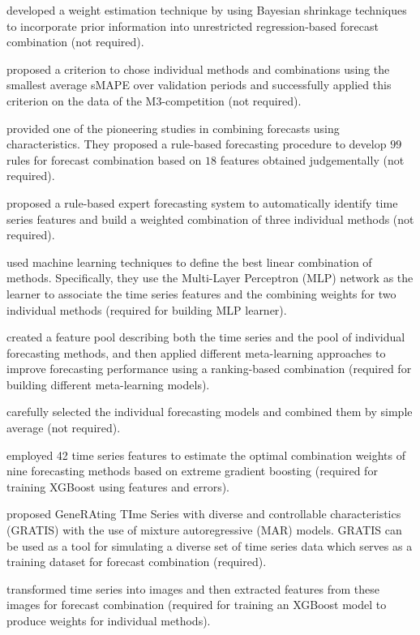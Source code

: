 \documentclass[11pt]{article}
\begin{document}
\cite{Diebold1990-fk} developed a weight estimation technique by using Bayesian shrinkage techniques to incorporate prior information into unrestricted regression-based forecast combination (not required).

\cite{Hibon2005-ok} proposed a criterion to chose individual methods and combinations using the smallest average sMAPE over validation periods and successfully applied this criterion on the data of the M3-competition (not required).

\cite{Collopy1992-ey} provided one of the pioneering studies in combining forecasts using characteristics. They proposed a rule-based forecasting procedure to develop $99$ rules for forecast combination based on $18$ features obtained judgementally (not required).

\cite{Vokurka1996-ot} proposed a rule-based expert forecasting system to automatically identify time series features and build a weighted combination of three individual methods (not required).

\cite{Prudencio2004-ze} used machine learning techniques to define the best linear combination of methods. Specifically, they use the Multi-Layer Perceptron (MLP) network as the learner to associate the time series features and the combining weights for two individual methods (required for building MLP learner).

\cite{Lemke2010-wn} created a feature pool describing both the time series and the pool of individual forecasting methods, and then applied different meta-learning approaches to improve forecasting performance using a ranking-based combination (required for building different meta-learning models).

\cite{Andrawis2011-fm} carefully selected the individual forecasting models and combined them by simple average (not required).

\cite{Montero-Manso2020-tq} employed 42 time series features to estimate the optimal combination weights of nine forecasting methods based on extreme gradient boosting (required for training XGBoost using features and errors).

\cite{Kang2020-rl} proposed GeneRAting TIme Series with diverse and controllable characteristics (GRATIS) with the use of mixture autoregressive (MAR) models. GRATIS can be used as a tool for simulating a diverse set of time series data which serves as a training dataset for forecast combination (required).

\cite{Li2020-od} transformed time series into images and then extracted features from these images for forecast combination (required for training an XGBoost model to produce weights for individual methods).
\end{document}
